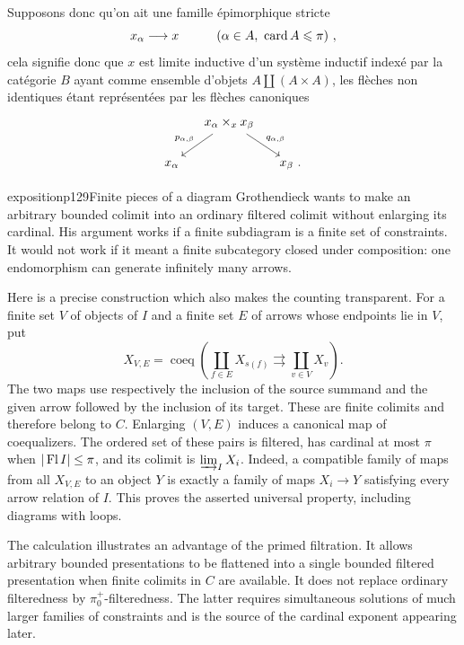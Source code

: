 Supposons donc qu'on ait une famille épimorphique stricte
\[ x_{\alpha} \longrightarrow x \qquad\quad (\alpha \in A,\ \operatorname{card} A \leqslant \pi) \ , \]
cela signifie donc que $x$ est limite inductive d'un système inductif indexé par la catégorie $B$ ayant comme ensemble d'objets $A \amalg (A\times A)$, les flèches non identiques étant représentées par les flèches canoniques
\[
\begin{tikzcd}[column sep=small]
& x_{\alpha} \times_x x_{\beta} \arrow[dl, "p_{\alpha,\beta}"'] \arrow[dr, "q_{\alpha,\beta}"] & \\
x_{\alpha} & & x_{\beta} \text{ .}
\end{tikzcd}
\]

\begin{dcomment}{exposition}{p129}{Finite pieces of a diagram}
Grothendieck wants to make an arbitrary bounded colimit into an ordinary filtered colimit without enlarging its cardinal. His argument works if a finite subdiagram is a finite set of constraints. It would not work if it meant a finite subcategory closed under composition: one endomorphism can generate infinitely many arrows.

Here is a precise construction which also makes the counting transparent. For a finite set $V$ of objects of $I$ and a finite set $E$ of arrows whose endpoints lie in $V$, put
\[
 X_{V,E}=\operatorname{coeq}\left(
 \coprod_{f\in E}X_{s(f)}\rightrightarrows
 \coprod_{v\in V}X_v\right).
\]
The two maps use respectively the inclusion of the source summand and the given arrow followed by the inclusion of its target. These are finite colimits and therefore belong to $C$. Enlarging $(V,E)$ induces a canonical map of coequalizers. The ordered set of these pairs is filtered, has cardinal at most $\pi$ when $|\operatorname{Fl} I|\leq\pi$, and its colimit is $\varinjlim_I X_i$. Indeed, a compatible family of maps from all $X_{V,E}$ to an object $Y$ is exactly a family of maps $X_i\to Y$ satisfying every arrow relation of $I$. This proves the asserted universal property, including diagrams with loops.

The calculation illustrates an advantage of the primed filtration. It allows arbitrary bounded presentations to be flattened into a single bounded filtered presentation when finite colimits in $C$ are available. It does not replace ordinary filteredness by $\pi_0^+$-filteredness. The latter requires simultaneous solutions of much larger families of constraints and is the source of the cardinal exponent appearing later.
\end{dcomment}


